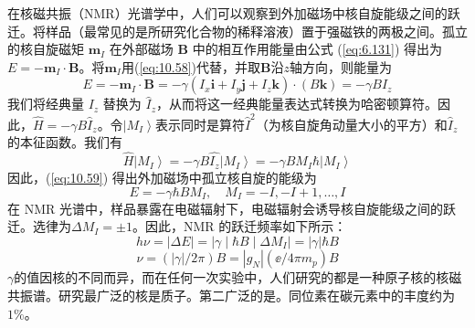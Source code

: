     在核磁共振（NMR）光谱学中，人们可以观察到外加磁场中核自旋能级之间的跃迁。将样品（最常见的是所研究化合物的稀释溶液）置于强磁铁的两极之间。孤立的核自旋磁矩 $\mathbf{m}_I$ 在外部磁场 $\mathbf{B}$ 中的相互作用能量由公式 (\ref{eq:6.131}) 得出为$E = -\mathbf{m}_I \cdot \mathbf{B}$。将$\mathbf{m}_I$用(\ref{eq:10.58})代替，并取$\mathbf{B}$沿$z$轴方向，则能量为
    \begin{equation*}
        E = -\mathbf{m}_{I} \cdot \mathbf{B} = -\gamma \left(I_{x}\mathbf{i} + I_{y}\mathbf{j} + I_{z}\mathbf{k}\right) \cdot \left(B\mathbf{k}\right) = -\gamma B I_{z}
    \end{equation*}
    我们将经典量 $I_z$ 替换为 $\hat{I}_z$，从而将这一经典能量表达式转换为哈密顿算符。因此，$\hat{H} = -\gamma B \hat{I}_z$。令$\left| M_I \right\rangle$表示同时是算符$\hat{I}^2$（为核自旋角动量大小的平方）和$\hat{I}_z$的本征函数。我们有
    \begin{equation}
        \hat{H} \left| M_I \right\rangle = - \gamma B \hat{I_z} \left| M_I \right\rangle = - \gamma B M_I \hbar \left| M_I \right\rangle
        \label{eq:10.59}
    \end{equation}
    因此，(\ref{eq:10.59}) 得出外加磁场中孤立核自旋的能级为
    \begin{equation*}
        E = -\gamma \hbar B M_I, \quad M_I = -I, -I+1, \ldots, I
    \end{equation*}
    在 NMR 光谱中，样品暴露在电磁辐射下，电磁辐射会诱导核自旋能级之间的跃迁。选律为$\Delta M_I = \pm 1$。因此，NMR 的跃迁频率如下所示：
    \begin{equation*}
        h\nu = \left|\Delta E\right| = \left|\gamma \middle| \hbar B \middle| \Delta M_I\right| = \left|\gamma \right| \hbar B
    \end{equation*}
    \begin{equation}
        \nu = \left(\left|\gamma\right|/2\pi\right)B = \left|g_N\right| \left(\ee /4\pi m_p\right)B
        \label{eq:10.60}
    \end{equation}
    $\gamma$的值因核的不同而异，而在任何一次实验中，人们研究的都是一种原子核的核磁共振谱。研究最广泛的核是质子。第二广泛的是。同位素在碳元素中的丰度约为$1\%$。

